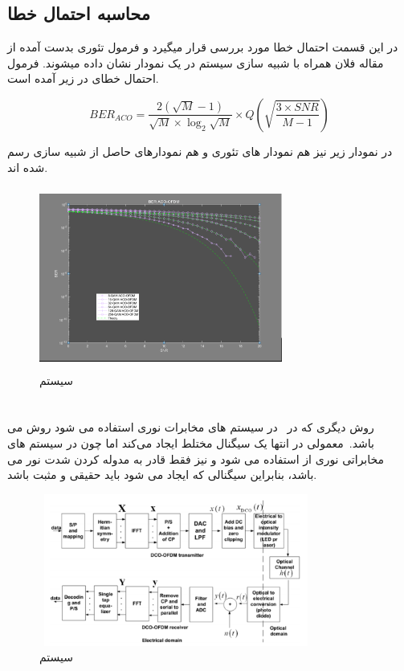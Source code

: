 \documentclass{article}
\begin{document}
\subsection{محاسبه احتمال خطا}
در این قسمت احتمال خطا  مورد بررسی قرار میگیرد و فرمول تئوری بدست آمده از مقاله فلان همراه با شبیه سازی سیستم در یک نمودار نشان داده میشوند. فرمول احتمال خطای  در زیر آمده است.

\begin{equation}
BER_{ACO} = \frac{2(\sqrt{M}-1)}{\sqrt{M}\times \log_{2}\sqrt{M}} \times Q(\sqrt{\frac{3\times SNR}{M - 1}})
\label{acober}
\end{equation}


در نمودار زیر نیز هم نمودار های تئوری و هم نمودارهای حاصل از شبیه سازی رسم شده اند.

\begin{figure}[h!]
\begin{center}
\includegraphics[width=8cm, height=6cm]{acober.PNG}
\end{center}
\caption{  سیستم }
\label{acomodel}

\end{figure}

\section{}
روش دیگری که در \ در سیستم های مخابرات نوری استفاده می شود روش        
می باشد.\ معمولی در انتها یک سیگنال مختلط ایجاد می‌کند اما چون در سیستم های مخابراتی نوری از   استفاده می شود و  نیز فقط قادر به مدوله کردن شدت نور می باشد، بنابراین سیگنالی که ایجاد می شود باید حقیقی و مثبت باشد. 

\begin{figure}[h!]
\begin{center}
\includegraphics[width=9cm, height=5cm]{dco.PNG}
\end{center}
\caption{  سیستم }
\label{dcomodel}

\end{figure}
\end{document}
